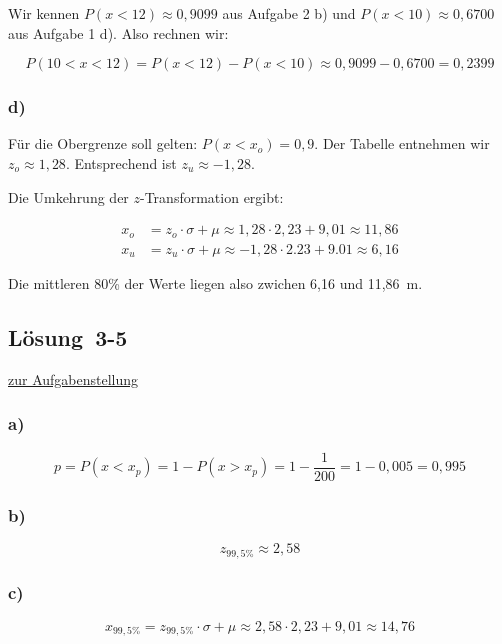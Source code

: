 \documentclass[
  11pt,
  ngerman,
  a4paper,
]{report}
\begin{document}
Wir kennen \(P(x < 12)\approx0,9099\) aus Aufgabe 2 b) und \(P(x<10)\approx0,6700\) aus Aufgabe 1 d). Also rechnen wir:

\[P(10<x<12) = P(x<12) - P(x<10) \approx 0,9099 - 0,6700 = 0,2399\]

\hypertarget{d-4}{%
\subsubsection{d)}\label{d-4}}

Für die Obergrenze soll gelten: \(P(x<x_o) = 0,9\). Der Tabelle entnehmen wir \(z_o \approx 1,28\). Entsprechend ist \(z_u\approx-1,28\).

Die Umkehrung der \(z\)-Transformation ergibt:

\[\begin{aligned}
x_o&=z_o\cdot\sigma + \mu\approx1,28\cdot2,23 +9,01\approx11,86\\
x_u&=z_u\cdot\sigma + \mu\approx-1,28\cdot2.23 +9.01\approx6,16
\end{aligned}\]

Die mittleren 80\% der Werte liegen also zwichen 6,16 und 11,86~m.

\hypertarget{loesung-3-5}{%
\subsection{Lösung~3-5}\label{loesung-3-5}}

\protect\hyperlink{aufgabe-3-5}{zur Aufgabenstellung}

\hypertarget{a-12}{%
\subsubsection{a)}\label{a-12}}

\[p=P(x<x_p)=1-P(x>x_p)=1-\frac{1}{200}=1-0,005=0,995\]

\hypertarget{b-12}{%
\subsubsection{b)}\label{b-12}}

\[z_{99,5\%}\approx2,58\]

\hypertarget{c-10}{%
\subsubsection{c)}\label{c-10}}

\[x_{99,5\%}=z_{99,5\%}\cdot\sigma + \mu\approx2,58\cdot2,23+9,01\approx14,76\]
\end{document}
